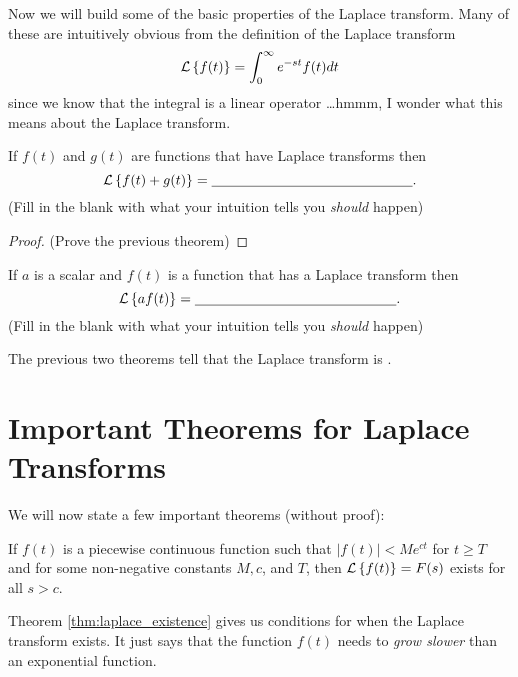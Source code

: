 Now we will build some of the basic properties of the Laplace transform.  Many of these
are intuitively obvious from the definition of the Laplace transform
\[ \mathcal{L}\left\{ f(t) \right\} = \int_0^\infty e^{-st} f(t) dt \]
since we know that the integral is a linear operator \ldots hmmm, I wonder what this means
about the Laplace transform.
\begin{thm}
    If $f(t)$ and $g(t)$ are functions that have Laplace transforms
        then
        \[ \mathcal{L}\left\{ f(t) + g(t) \right\} = \underline{\hspace{2in}}. \]
        (Fill in the blank with what your intuition tells you {\it should} happen)
\end{thm}
\begin{proof}
    (Prove the previous theorem)
\end{proof}

\begin{thm}
    If $a$ is a scalar and $f(t)$ is a function that has a Laplace
    transform then 
    \[ \mathcal{L}\left\{ af(t) \right\} = \underline{\hspace{2in}}. \]
    (Fill in the blank with what your intuition tells you {\it should} happen)
\end{thm}

\begin{problem}
    The previous two theorems tell that the Laplace transform is
    \underline{\hspace{1in}}.
\end{problem}



\newpage\section{Important Theorems for Laplace Transforms}
We will now state a few important theorems (without proof):

\begin{thm}\label{thm:laplace_existence}
    If $f(t)$ is a piecewise continuous function
    such that $|f(t)|< M e^{ct}$ for $t \ge T$ and for some non-negative constants $M,
    c$, and $T$, then $\mathcal{L}\left\{ f(t) \right\}=F(s)$ exists for all $s > c$.
\end{thm}
Theorem \ref{thm:laplace_existence} gives us conditions for when the Laplace transform
exists.  It just says that the function $f(t)$ needs to {\it grow slower} than an
exponential function. 

